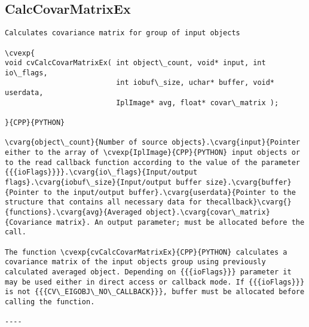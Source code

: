 \subsection{CalcCovarMatrixEx}
\begin{verbatim}
Calculates covariance matrix for group of input objects

\cvexp{
void cvCalcCovarMatrixEx( int object\_count, void* input, int io\_flags,
                          int iobuf\_size, uchar* buffer, void* userdata,
                          IplImage* avg, float* covar\_matrix );

}{CPP}{PYTHON}

\cvarg{object\_count}{Number of source objects}.\cvarg{input}{Pointer either to the array of \cvexp{IplImage}{CPP}{PYTHON} input objects or to the read callback function according to the value of the parameter {{{ioFlags}}}}.\cvarg{io\_flags}{Input/output flags}.\cvarg{iobuf\_size}{Input/output buffer size}.\cvarg{buffer}{Pointer to the input/output buffer}.\cvarg{userdata}{Pointer to the structure that contains all necessary data for thecallback}\cvarg{}{functions}.\cvarg{avg}{Averaged object}.\cvarg{covar\_matrix}{Covariance matrix}. An output parameter; must be allocated before the call.

The function \cvexp{cvCalcCovarMatrixEx}{CPP}{PYTHON} calculates a covariance matrix of the input objects group using previously calculated averaged object. Depending on {{{ioFlags}}} parameter it may be used either in direct access or callback mode. If {{{ioFlags}}} is not {{{CV\_EIGOBJ\_NO\_CALLBACK}}}, buffer must be allocated before calling the function.

----
\end{verbatim}
